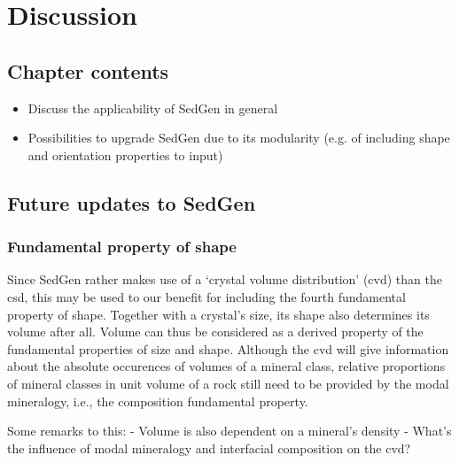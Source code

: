 \chapter{Discussion}\label{ch:discussion}

\section{Chapter contents}
\begin{itemize}
    \item Discuss the applicability of SedGen in general
    \item Possibilities to upgrade SedGen due to its modularity (e.g. of including shape and orientation properties to input)

\end{itemize}

\section{Future updates to SedGen}
    \subsection{Fundamental property of shape}
    Since SedGen rather makes use of a `crystal volume distribution' (cvd) than the csd, this may be used to our benefit for including the fourth fundamental property of shape. %
    Together with a crystal's size, its shape also determines its volume after all. %
    Volume can thus be considered as a derived property of the fundamental properties of size and shape. %
    Although the cvd will give information about the absolute occurences of volumes of a mineral class, relative proportions of mineral classes in unit volume of a rock still need to be provided by the modal mineralogy, i.e., the composition fundamental property. %

    Some remarks to this:
        - Volume is also dependent on a mineral's density
        - What's the influence of modal mineralogy and interfacial composition on the cvd?


